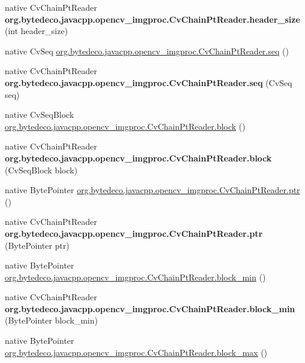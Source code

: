 \begin{DoxyCompactItemize}
native Cv\+Chain\+Pt\+Reader {\bfseries org.\+bytedeco.\+javacpp.\+opencv\+\_\+imgproc.\+Cv\+Chain\+Pt\+Reader.\+header\+\_\+size} (int header\+\_\+size)
\item 
native Cv\+Seq \hyperlink{group__imgproc_gac12edf088fb6665990d9ed77569fa2fc}{org.\+bytedeco.\+javacpp.\+opencv\+\_\+imgproc.\+Cv\+Chain\+Pt\+Reader.\+seq} ()
\item 
\mbox{\label{group__imgproc_ga0dbbd00088cbb54973169071b4cca1d8}} 
native Cv\+Chain\+Pt\+Reader {\bfseries org.\+bytedeco.\+javacpp.\+opencv\+\_\+imgproc.\+Cv\+Chain\+Pt\+Reader.\+seq} (Cv\+Seq seq)
\item 
native Cv\+Seq\+Block \hyperlink{group__imgproc_ga1c4f79fc49a25477fc78d53b3b321e13}{org.\+bytedeco.\+javacpp.\+opencv\+\_\+imgproc.\+Cv\+Chain\+Pt\+Reader.\+block} ()
\item 
\mbox{\label{group__imgproc_ga2b43fbee872f74a006c43b98732931d4}} 
native Cv\+Chain\+Pt\+Reader {\bfseries org.\+bytedeco.\+javacpp.\+opencv\+\_\+imgproc.\+Cv\+Chain\+Pt\+Reader.\+block} (Cv\+Seq\+Block block)
\item 
native Byte\+Pointer \hyperlink{group__imgproc_ga985f30fcc54d909935454e69374f4f7b}{org.\+bytedeco.\+javacpp.\+opencv\+\_\+imgproc.\+Cv\+Chain\+Pt\+Reader.\+ptr} ()
\item 
\mbox{\label{group__imgproc_ga04740e3a2994b05b27f1c30d4c3d475a}} 
native Cv\+Chain\+Pt\+Reader {\bfseries org.\+bytedeco.\+javacpp.\+opencv\+\_\+imgproc.\+Cv\+Chain\+Pt\+Reader.\+ptr} (Byte\+Pointer ptr)
\item 
native Byte\+Pointer \hyperlink{group__imgproc_ga59c7fe18e76ef40cdc54d800e1d38524}{org.\+bytedeco.\+javacpp.\+opencv\+\_\+imgproc.\+Cv\+Chain\+Pt\+Reader.\+block\+\_\+min} ()
\item 
\mbox{\label{group__imgproc_gafceee5b501b38f6a07f51a010b623c1b}} 
native Cv\+Chain\+Pt\+Reader {\bfseries org.\+bytedeco.\+javacpp.\+opencv\+\_\+imgproc.\+Cv\+Chain\+Pt\+Reader.\+block\+\_\+min} (Byte\+Pointer block\+\_\+min)
\item 
native Byte\+Pointer \hyperlink{group__imgproc_ga8ac948c1c8f720d6b5082ad1bf147d92}{org.\+bytedeco.\+javacpp.\+opencv\+\_\+imgproc.\+Cv\+Chain\+Pt\+Reader.\+block\+\_\+max} ()
\item 
\mbox{\label{group__imgproc_ga614773279075865ccdc1cc1fcbad64be}} 

\end{DoxyCompactItemize}

